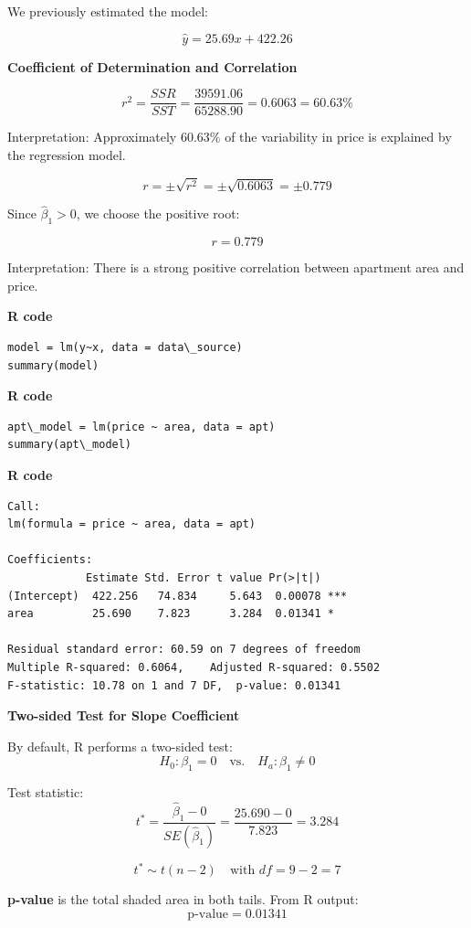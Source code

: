 \begin{example}
We previously estimated the model:

\[
\hat{y} = 25.69x + 422.26
\]

\textbf{Coefficient of Determination and Correlation}

\[
r^2 = \frac{SSR}{SST} = \frac{39591.06}{65288.90} = 0.6063 = 60.63\%
\]

Interpretation: Approximately 60.63\% of the variability in price is explained by the regression model.

\[
r = \pm \sqrt{r^2} = \pm \sqrt{0.6063} = \pm 0.779
\]

Since \( \hat{\beta}_1 > 0 \), we choose the positive root:

\[
r = 0.779
\]

Interpretation: There is a strong positive correlation between apartment area and price.

\noindent\textbf{R code}
\begin{tcolorbox}[colback=gray!10, colframe=black!45, arc=2mm]
\begin{verbatim}
model = lm(y~x, data = data\_source) 
summary(model)
\end{verbatim}
\end{tcolorbox}

\noindent\textbf{R code}
\begin{tcolorbox}[colback=gray!10, colframe=black!45, arc=2mm]
\begin{verbatim}
apt\_model = lm(price ~ area, data = apt)
summary(apt\_model)
\end{verbatim}
\end{tcolorbox}

\noindent\textbf{R code}
\begin{tcolorbox}[colback=gray!10, colframe=black!45, arc=2mm]
\begin{verbatim}
Call:
lm(formula = price ~ area, data = apt)

Coefficients:
            Estimate Std. Error t value Pr(>|t|)
(Intercept)  422.256   74.834     5.643  0.00078 ***
area         25.690    7.823      3.284  0.01341 *

Residual standard error: 60.59 on 7 degrees of freedom
Multiple R-squared: 0.6064,    Adjusted R-squared: 0.5502 
F-statistic: 10.78 on 1 and 7 DF,  p-value: 0.01341
\end{verbatim}
\end{tcolorbox}

\textbf{Two-sided Test for Slope Coefficient}

By default, R performs a two-sided test:
\[
H_0: \beta_1 = 0 \quad \text{vs.} \quad H_a: \beta_1 \neq 0
\]

\vspace{0.3cm}

Test statistic:
\[
t^* = \frac{\hat{\beta}_1 - 0}{SE(\hat{\beta}_1)} = \frac{25.690 - 0}{7.823} = 3.284
\]

\[
t^* \sim t(n - 2) \quad \text{with } df = 9 - 2 = 7
\]

\vspace{0.5cm}

\textbf{p-value} is the total shaded area in both tails. From R output:
\[
\text{p-value} = 0.01341
\]

\end{example}
